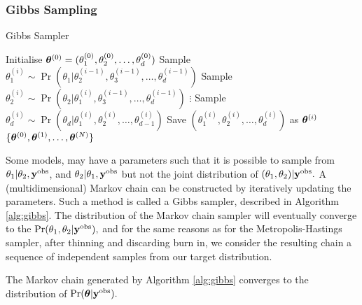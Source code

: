 \subsubsection*{Gibbs Sampling}

\begin{algorithm}[htbp]
    \caption{Gibbs Sampler}
    \label{alg:gibbs}
    \begin{algorithmic}
        \State Initialise
        $\bm{\theta}^{(0)} = (\theta_1^{(0)}, \theta_2^{(0)}, \dots, \theta_d^{(0)})$
        \State Sample
        $\theta_1^{(i)}
            \sim \Pr(
            \theta_1
            | \theta_2^{(i-1)}, \theta_3^{(i-1)}, \dots, \theta_d^{(i-1)}
            )$
        \State Sample
        $\theta_2^{(i)}
            \sim \Pr(
            \theta_2
            | \theta_1^{(i)}, \theta_3^{(i-1)}, \dots, \theta_d^{(i-1)})$
        \State $\vdots$
        \State Sample
        $\theta_d^{(i)}
            \sim \Pr(
            \theta_d
            | \theta_1^{(i)}, \theta_2^{(i)}, \dots, \theta_{d-1}^{(i)})$
        \State Save $(\theta_1^{(i)}, \theta_2^{(i)}, \dots, \theta_d^{(i)})$
        as $\bm{\theta}^{(i)}$
        \EndFor
        \State \Return $\{\bm{\theta}^{(0)}, \bm{\theta}^{(1)}, \dots, \bm{\theta}^{(N)}\}$
    \end{algorithmic}
\end{algorithm}

Some models, may have a parameters such that it is possible
to sample from $\theta_1 | \theta_2, \mathbf{y}^{\mathrm{obs}}$, and
$\theta_2 | \theta_1, \mathbf{y}^{\mathrm{obs}}$ but not the joint distribution of
$(\theta_1, \theta_2)| \mathbf{y}^{\mathrm{obs}}.$ A (multidimensional) Markov chain can be
constructed by iteratively updating the parameters. Such a method is called
a Gibbs sampler, described in
Algorithm \ref{alg:gibbs}. The distribution of the Markov chain
sampler will eventually converge to the
$\Pr(\theta_1, \theta_2 | \mathbf{y}^{\mathrm{obs}}),$ and for the same reasons as for
the Metropolis-Hastings
sampler, after thinning and discarding burn in, we consider the resulting
chain a sequence of independent samples from our target distribution.

\begin{theorem}
    The Markov chain generated by Algorithm \ref{alg:gibbs}
    converges to the distribution of $\Pr(\bm{\theta}|\mathbf{y}^{\mathrm{obs}}).$
\end{theorem}

